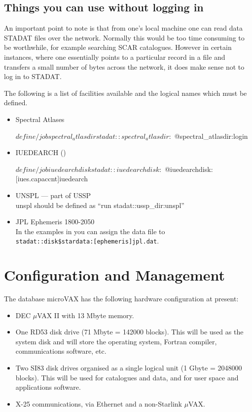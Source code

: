 \documentclass[nolof,11pt,noabs]{starlink}
\begin{document}
\subsection{Things you can use without logging in}

An important point to note is that from one's local machine one can
read data STADAT files over the network. Normally this would be
too time consuming to be worthwhile, for example searching SCAR catalogues.
However in certain instances, where one essentially points to a particular
record in a file and transfers a small number of bytes across the network,
it does make sense not to log in to STADAT.

The following is a list of facilities available and the logical names
which must be defined.

\begin{itemize}
\item Spectral Atlases
\begin{terminalv}
$ define/job spectral_atlasdir stadat::spectral_atlasdir:
$ @spectral_atlasdir:login
\end{terminalv}
\item IUEDEARCH ()
\begin{terminalv}
$ define/job iuedearchdisk stadat::iuedearchdisk:
$ @iuedearchdisk:[iues.capaccnt]iuedearch
\end{terminalv}
\item UNSPL --- part of USSP\\
 unspl should be defined as ``run stadat::ussp\_dir:unspl''
\item    JPL Ephemeris 1800-2050  \\
         In the examples in  you can assign the data file to\\
         \texttt{stadat::disk\$stardata:[ephemeris]jpl.dat}.

\end{itemize}



\section{Configuration and Management}

The database microVAX has the following hardware configuration at present:
\begin{itemize}
\item DEC $\mu$VAX II with 13 Mbyte memory.
\item One RD53 disk drive (71 Mbyte = 142000 blocks).
This will be used as the system disk and will store the operating system,
Fortran compiler, communications software, etc.
\item Two SI83 disk drives organised as a single logical unit
(1 Gbyte = 2048000 blocks).
This will be used for catalogues and data, and for user space and
applications software.
\item X-25 communications, via Ethernet and a non-Starlink $\mu$VAX.
\end{itemize}
\end{document}
